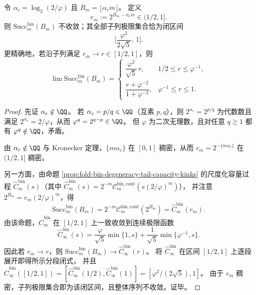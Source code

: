 \begin{theorem}\label{thm:fold-bin-critical-rounding-logperiodic}
令 \(\alpha_c=\log_2(2/\varphi)\) 且 \(B_m=\lfloor \alpha_c m\rfloor\)。
定义
\[
r_m:=2^{B_m-\alpha_c m}\in(1/2,1].
\]
则 \(\mathrm{Succ}^{\mathrm{bin}}_m(B_m)\) 不收敛；其全部子列极限集合恰为闭区间
\[
\biggl[\frac{\varphi^2}{2\sqrt5},\,1\biggr].
\]
更精确地，若沿子列满足 \(r_m\to r\in[1/2,1]\)，则
\[
\lim \mathrm{Succ}^{\mathrm{bin}}_m(B_m)
=
\begin{cases}
\dfrac{\varphi^2}{\sqrt5}\,r, & 1/2\le r\le\varphi^{-1},\\[10pt]
\dfrac{r+\varphi^{-2}}{1+\varphi^{-2}}, & \varphi^{-1}\le r\le 1.
\end{cases}
\]
\end{theorem}
\begin{proof}
先证 \(\alpha_c\notin\QQ\)。
若 \(\alpha_c=p/q\in\QQ\)（互素 \(p,q\)），则 \(2^{\alpha_c}=2^{p/q}\) 为代数数且满足
\(
2^{\alpha_c}=2/\varphi
\)，从而 \(\varphi^q=2^{q-p}\in\QQ\)。
但 \(\varphi\) 为二次无理数，且对任意 \(q\ge 1\) 都有 \(\varphi^q\notin\QQ\)，矛盾。
\par
由 \(\alpha_c\notin\QQ\) 与 Kronecker 定理，\(\{m\alpha_c\}\) 在 \([0,1]\) 稠密，从而
\(
r_m=2^{-\{m\alpha_c\}}
\)
在 \((1/2,1]\) 稠密。
\par
另一方面，由命题 \ref{prop:fold-bin-degeneracy-tail-capacity-kinks} 的尺度化容量过程 \(\widehat C_m^{\mathrm{bin}}(s)\)（其中
\(\widehat C_m^{\mathrm{bin}}(s)=2^{-m}\mathcal C_m^{\mathrm{bin,cont}}(s(2/\varphi)^m)\)），
并注意 \(2^{B_m}=r_m(2/\varphi)^m\)，得
\[
\mathrm{Succ}^{\mathrm{bin}}_m(B_m)
=2^{-m}\mathcal C_m^{\mathrm{bin,cont}}(2^{B_m})
=\widehat C_m^{\mathrm{bin}}(r_m).
\]
由该命题，\(\widehat C_m^{\mathrm{bin}}\) 在 \([1/2,1]\) 上一致收敛到连续极限函数
\[
\widehat C_\infty^{\mathrm{bin}}(s)
=\frac{\varphi}{\sqrt5}\min\{1,s\}+\frac{1}{\sqrt5}\min\{\varphi^{-1},s\}.
\]
因此若 \(r_m\to r\)，则 \(\mathrm{Succ}^{\mathrm{bin}}_m(B_m)\to \widehat C_\infty^{\mathrm{bin}}(r)\)。
将 \(\widehat C_\infty^{\mathrm{bin}}\) 在区间 \([1/2,1]\) 上逐段展开即得所示分段闭式，
并且 \(\widehat C_\infty^{\mathrm{bin}}([1/2,1])=[\widehat C_\infty^{\mathrm{bin}}(1/2),\widehat C_\infty^{\mathrm{bin}}(1)]=[\varphi^2/(2\sqrt5),1]\)。
由于 \(r_m\) 稠密，子列极限集合即为该闭区间，且整体序列不收敛。证毕。
\end{proof}

